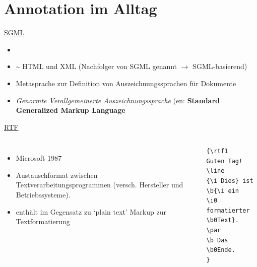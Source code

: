 \section{Annotation im Alltag}
\begin{frame}{\href{https://de.wikipedia.org/wiki/Standard_Generalized_Markup_Language}{SGML}}

\begin{itemize}
    \item {}
    \item {} \textasciitilde
HTML und XML (Nachfolger von SGML genannt $\to$  SGML-basierend) 
    \item Metasprache zur Definition von Auszeichnungssprachen für Dokumente 
    \item \emph{Genormte Verallgemeinerte Auszeichnungssprache} (en: \textbf{Standard Generalized Markup Language}
\end{itemize}


\end{frame}





\begin{frame}[fragile]{\href{https://de.wikipedia.org/wiki/Rich_Text_Format}{RTF}}
\begin{columns}
\begin{itemize}
    \item Microsoft 1987 \item Austauschformat zwischen Textverarbeitungsprogrammen (versch. Hersteller und Betriebssysteme). \item enthält im Gegensatz zu `plain text' Markup zur Textformatierung
\end{itemize}
\\
\footnotesize
\begin{verbatim}
{\rtf1
Guten Tag!
\line
{\i Dies} ist \b{\i ein
\i0 formatierter \b0Text}.
\par
\b Das \b0Ende.
} 
\end{verbatim}\normalsize
\end{columns}

\end{frame}

